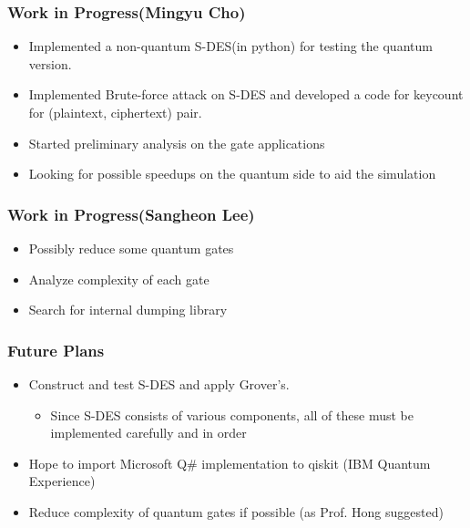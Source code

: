 \documentclass{beamer}
\begin{document}
	\begin{frame}
		\frametitle{Work in Progress(Mingyu Cho)}
		\begin{itemize}
			\item Implemented a non-quantum S-DES(in python) for testing the quantum version.
			\item Implemented Brute-force attack on S-DES and developed a code for keycount for (plaintext, ciphertext) pair.
			\item Started preliminary analysis on the gate applications
			\item Looking for possible speedups on the quantum side to aid the simulation
		\end{itemize}
	\end{frame}
	
	\begin{frame}
		\frametitle{Work in Progress(Sangheon Lee)}
		\begin{itemize}
            \item Possibly reduce some quantum gates
            \item Analyze complexity of each gate
            \item Search for internal dumping library
		\end{itemize}
	\end{frame}
	
	\begin{frame}
		\frametitle{Future Plans}
		\begin{itemize}
			\item Construct and test S-DES and apply Grover's.
            \begin{itemize}
                \item Since S-DES consists of various components, all of these must be implemented carefully and in order
            \end{itemize}
            \item Hope to import Microsoft Q\# implementation to qiskit (IBM Quantum Experience)
            \item Reduce complexity of quantum gates if possible (as Prof. Hong suggested)
		\end{itemize}
	\end{frame}
\end{document}
